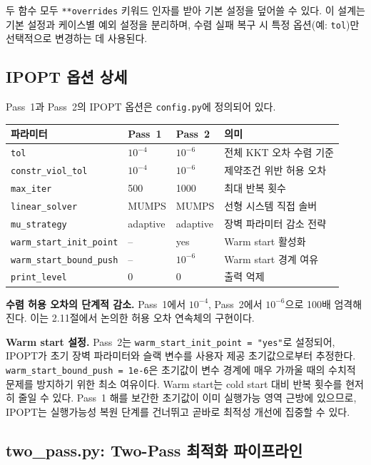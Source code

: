 \documentclass[11pt]{article}
\begin{document}
두 함수 모두 \texttt{**overrides} 키워드 인자를 받아 기본 설정을 덮어쓸 수 있다. 이 설계는 기본 설정과 케이스별 예외 설정을 분리하며, 수렴 실패 복구 시 특정 옵션(예: \texttt{tol})만 선택적으로 변경하는 데 사용된다.

\subsection{IPOPT 옵션 상세}

Pass~1과 Pass~2의 IPOPT 옵션은 \texttt{config.py}에 정의되어 있다.

\begin{table}[h]
\centering
\begin{tabular}{@{}llll@{}}
\toprule
파라미터 & Pass~1 & Pass~2 & 의미 \\
\midrule
\texttt{tol} & $10^{-4}$ & $10^{-6}$ & 전체 KKT 오차 수렴 기준 \\
\texttt{constr\_viol\_tol} & $10^{-4}$ & $10^{-6}$ & 제약조건 위반 허용 오차 \\
\texttt{max\_iter} & 500 & 1000 & 최대 반복 횟수 \\
\texttt{linear\_solver} & MUMPS & MUMPS & 선형 시스템 직접 솔버 \\
\texttt{mu\_strategy} & adaptive & adaptive & 장벽 파라미터 감소 전략 \\
\texttt{warm\_start\_init\_point} & -- & yes & Warm start 활성화 \\
\texttt{warm\_start\_bound\_push} & -- & $10^{-6}$ & Warm start 경계 여유 \\
\texttt{print\_level} & 0 & 0 & 출력 억제 \\
\bottomrule
\end{tabular}
\end{table}

\textbf{수렴 허용 오차의 단계적 감소.} Pass~1에서 $10^{-4}$, Pass~2에서 $10^{-6}$으로 100배 엄격해진다. 이는 2.11절에서 논의한 허용 오차 연속체의 구현이다.

\textbf{Warm start 설정.} Pass~2는 \texttt{warm\_start\_init\_point = "yes"}로 설정되어, IPOPT가 초기 장벽 파라미터와 슬랙 변수를 사용자 제공 초기값으로부터 추정한다. \texttt{warm\_start\_bound\_push = 1e-6}은 초기값이 변수 경계에 매우 가까울 때의 수치적 문제를 방지하기 위한 최소 여유이다. Warm start는 cold start 대비 반복 횟수를 현저히 줄일 수 있다. Pass~1 해를 보간한 초기값이 이미 실행가능 영역 근방에 있으므로, IPOPT는 실행가능성 복원 단계를 건너뛰고 곧바로 최적성 개선에 집중할 수 있다.

\subsection{two\_pass.py: Two-Pass 최적화 파이프라인}
\end{document}
